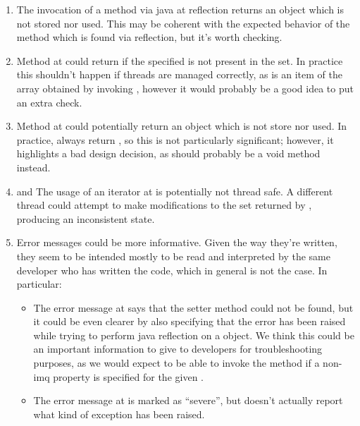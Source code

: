 \begin{enumerate}
	\item {} The invocation of a method via java at  reflection returns an  object which is not stored nor used. This may be coherent with the expected behavior of the  method which is found via reflection, but it's worth checking. 
	\item {} Method  at  could return  if the specified  is not present in the  set. In practice this shouldn't happen if threads are managed correctly, as  is an item of the array obtained by invoking , however it would probably be a good idea to put an extra check. 
	\item {} Method  at  could potentially return an  object which is not store nor used. In practice,  always return , so this is not particularly significant; however, it highlights a bad design decision, as  should probably be a void method instead. 
	\item {} and  The usage of an iterator at  is potentially not thread safe. A different thread could attempt to make modifications to the set returned by , producing an inconsistent state. 
	\item {} Error messages could be more informative. Given the way they're written, they seem to be intended mostly to be read and interpreted by the same developer who has written the code, which in general is not the case. In particular:
		\begin{itemize}
			\item The error message at  says that the setter method could not be found, but it could be even clearer by also specifying that the error has been raised while trying to perform java reflection on a  object. We think this could be an important information to give to developers for troubleshooting purposes, as we would expect to be able to invoke the  method if a non- imq property is specified for the given . 
			\item The error message at  is marked as “severe”, but doesn't actually report what kind of exception has been raised. 

\end{itemize}
\end{enumerate}
